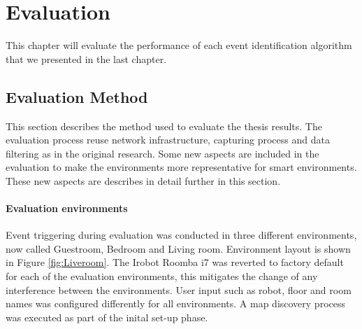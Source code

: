 \chapter{Evaluation}
\label{cap:Evaluation}
This chapter will evaluate the performance of each event identification algorithm that we presented in the last chapter.


\section{Evaluation Method}
This section describes the method used to evaluate the thesis results. The evaluation process reuse network infrastructure, capturing process and data filtering as in the original research. Some new aspects are included in the evaluation to make the environments more representative for smart environments. These new aspects are describes in detail further in this section.

\subsubsection{Evaluation environments}
Event triggering during evaluation was conducted in three different environments, now called Guestroom, Bedroom and Living room. Environment layout is shown in Figure \ref{fig:Liveroom}. The Irobot Roomba i7 was reverted to factory default for each of the evaluation environments, this mitigates the change of any interference between the environments. User input such as robot, floor and room names was configured differently for all environments. A map discovery process was executed as part of the inital set-up phase.


